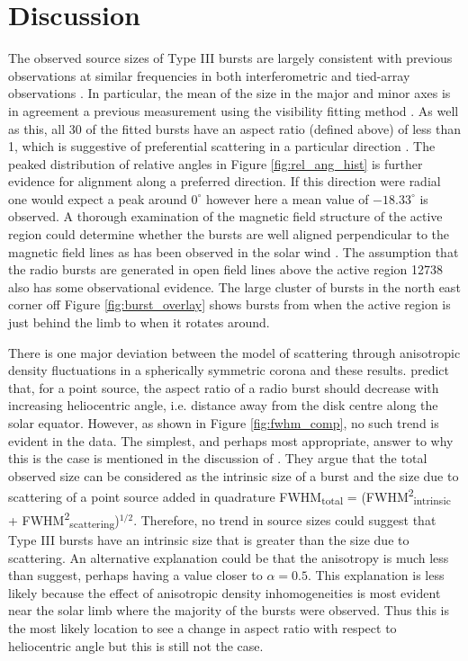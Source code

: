\section{Discussion}
\label{sec:obsvtheory_discussion}
The observed source sizes of Type III bursts are largely consistent with previous observations at similar frequencies in both interferometric and tied-array observations \citep{Kontar2017, Zhang2020}. In particular, the mean of the size in the major and minor axes is in agreement a previous measurement using the visibility fitting method \citep{Murphy2021}. As well as this, all 30 of the fitted bursts have an aspect ratio (defined above) of less than 1, which is suggestive of preferential scattering in a particular direction \citep{Anantharamaiah1994, Bastian1994}. The peaked distribution of relative angles in Figure \ref{fig:rel_ang_hist} is further evidence for alignment along a preferred direction. If this direction were radial one would expect a peak around $0^\circ$ however here a mean value of $-18.33^\circ$ is observed. A thorough examination of the magnetic field structure of the active region could determine whether the bursts are well aligned perpendicular to the magnetic field lines as has been observed in the solar wind \citep{Anantharamaiah1994, SasikumarRaja2016}. The assumption that the radio bursts are generated in open field lines above the active region 12738 also has some observational evidence. The large cluster of bursts in the north east corner off Figure \ref{fig:burst_overlay} shows bursts from when the active region is just behind the limb to when it rotates around.

There is one major deviation between the model of scattering through anisotropic density fluctuations in a spherically symmetric corona and these results. \cite{Kontar2019} predict that, for a point source, the aspect ratio of a radio burst should decrease with increasing heliocentric angle, i.e. distance away from the disk centre along the solar equator. However, as shown in Figure \ref{fig:fwhm_comp}, no such trend is evident in the data.  The simplest, and perhaps most appropriate, answer to why this is the case is mentioned in the discussion of \cite{Kontar2019}. They argue that the total observed size can be considered as the intrinsic size of a burst and the size due to scattering of a point source added in quadrature FWHM\textsubscript{total} = (FWHM\textsuperscript{2}\textsubscript{intrinsic} + FWHM\textsuperscript{2}\textsubscript{scattering})$^{1/2}$. Therefore, no trend in source sizes could suggest that Type III bursts have an intrinsic size that is greater than the size due to scattering. An alternative explanation could be that the anisotropy is much less than \cite{Kontar2019} suggest, perhaps having a value closer to $\alpha = 0.5$. This explanation is less likely because the effect of anisotropic density inhomogeneities is most evident near the solar limb where the majority of the bursts were observed. Thus this is the most likely location to see a change in aspect ratio with respect to heliocentric angle but this is still not the case.

